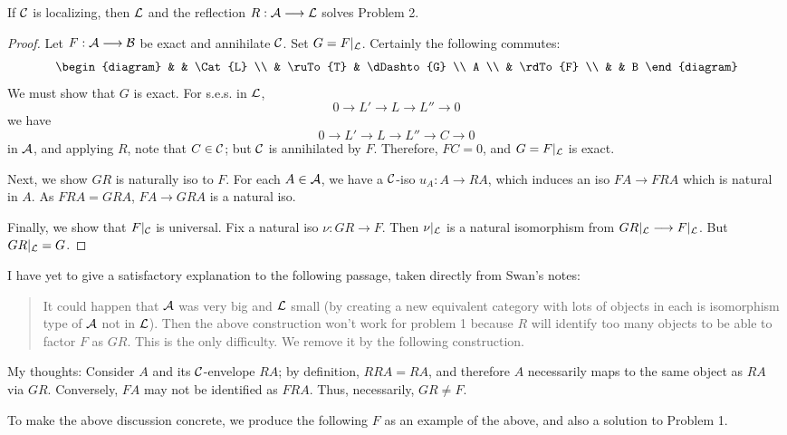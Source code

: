 \vskip 10pt
\begin{prop} \label{prop_2_0}
If $\mathcal{C}$ is localizing, then $\mathcal{L}$ and the reflection
$R: \mathcal{A} \longrightarrow \mathcal{L}$ solves Problem 2.
\end{prop}
\begin{proof}
Let $F: \mathcal{A} \longrightarrow \mathcal{B}$ be exact and annihilate $\mathcal{C}$.
Set $G = F|_{\mathcal{L}}$. Certainly the following commutes:
\[
\begin{diagram}
   &          & \Cat{L}     \\
   & \ruTo{T} & \dDashto{G} \\
 A \\
   & \rdTo{F} \\
   &          & B
\end{diagram}
\]
We must show that $G$ is exact. For s.e.s. in $\mathcal{L}$,
\[
0 \to L' \to L \to L'' \to 0
\]
we have
\[
0 \to L' \to L \to L'' \to C \to 0
\]
in $\mathcal{A}$, and applying $R$, note that $C \in \mathcal{C}$;
but $\mathcal{C}$ is annihilated by $F$. Therefore, $FC = 0$,
and $G = F|_{\mathcal{L}}$ is exact.

Next, we show $GR$ is naturally iso to $F$. For each $A \in
\mathcal{A}$, we have a $\mathcal{C}$-iso $u_A : A \to RA$, which
induces an iso $FA \to FRA$ which is natural in $A$. As
$FRA = GRA$, $FA \to GRA$ is a natural iso.

Finally, we show that $F|_{\mathcal{C}}$ is universal. Fix a
natural iso $\nu : GR \to F$. Then $\nu|_{\mathcal{L}}$ is a
natural isomorphism from $GR|_{\mathcal{L}} \longrightarrow F|_{\mathcal{L}}$.
But $GR|_{\mathcal{L}} = G$.
\end{proof}

\begin{rmk}
I have yet to give a satisfactory explanation to the following 
passage, taken directly from Swan's notes:

\begin{quotation}
It could happen that $\mathcal{A}$ was very big and $\mathcal{L}$ small 
(by creating a new equivalent category with lots of objects in 
each is isomorphism type of $\mathcal{A}$ not in $\mathcal{L}$). Then the 
above construction won't work for problem 1 because $R$ will 
identify too many objects to be able to factor $F$ as $GR$. This
is the only difficulty. We remove it by the following construction.
\end{quotation}

My thoughts: Consider $A$ and its $\mathcal{C}$-envelope $RA$; by 
definition, $RRA = RA$, and therefore $A$ necessarily maps to the 
same object as $RA$ via $GR$. Conversely, $FA$ may not be 
identified as $FRA$. Thus, necessarily, $GR \neq F$.

To make the above discussion concrete, we produce the following
$F$ as an example of the above, and also a solution to Problem 1.
\end{rmk}

